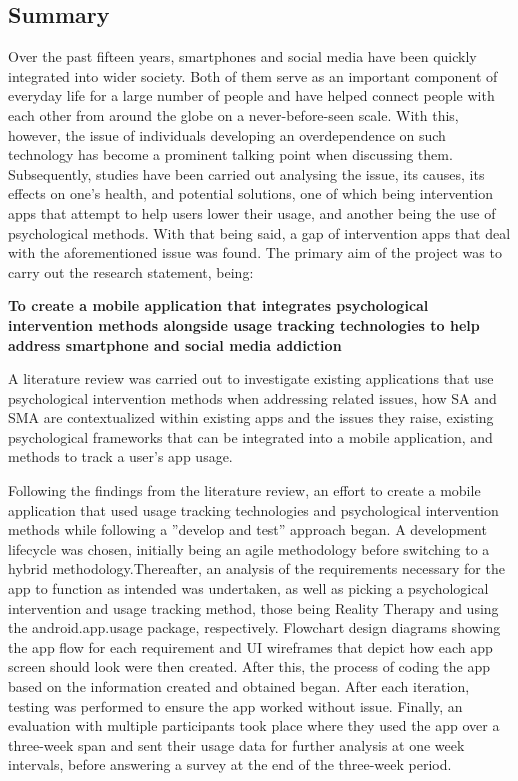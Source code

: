 \documentclass[12pt]{article}
\begin{document}
\subsection{Summary}
Over the past fifteen years, smartphones and social media have been quickly integrated into wider society. Both of them serve as an important component of everyday life for a large number of 
people and have helped connect people with each other from around the globe on a never-before-seen scale. With this, however, the issue of individuals developing an overdependence on such 
technology has become a prominent talking point when discussing them. Subsequently, studies have been carried out analysing the issue, its causes, its effects on one's health, and potential 
solutions, one of which being intervention apps that attempt to help users lower their usage, and another being the use of psychological methods. With that being said, a gap of intervention apps
that deal with the aforementioned issue was found. The primary aim of the project was to carry out the research statement, being: \newline

\textbf{To create a mobile application that integrates psychological intervention methods alongside usage tracking technologies to help address smartphone and social media addiction} \newline

A literature review was carried out to investigate existing applications that use psychological intervention methods when addressing related issues, how SA and SMA are contextualized within 
existing apps and the issues they raise, existing psychological frameworks that can be integrated into a mobile application, and methods to track a user's app usage. \newline

Following the findings from the literature review, an effort to create a mobile application that used usage tracking technologies and psychological intervention methods while following a 
”develop and test” approach began. A development lifecycle was chosen, initially being an agile methodology before switching to a hybrid methodology.Thereafter, an analysis of the requirements 
necessary for the app to function as intended was undertaken, as well as picking a psychological intervention and usage tracking method, those being Reality Therapy and using the
android.app.usage package, respectively. Flowchart design diagrams showing the app flow for each requirement and UI wireframes that depict how each app screen should look were then created. 
After this, the process of coding the app based on the information created and obtained began. After each iteration, testing was performed to ensure the app worked without issue. Finally, an 
evaluation with multiple participants took place where they used the app over a three-week span and sent their usage data for further analysis at one week intervals, before answering a survey 
at the end of the three-week period.
\end{document}
